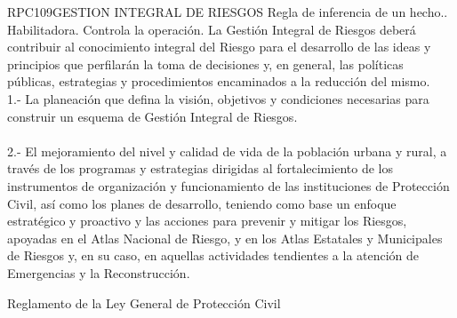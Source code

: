 \begin{BusinessRule}{RPC109}{GESTION INTEGRAL DE RIESGOS}{
		Regla de inferencia de un hecho..
	}{
		Habilitadora. 
	}{
		Controla la operación. %
	}
	\BRItem[Descripción:] La Gestión Integral de Riesgos deberá contribuir al conocimiento integral del Riesgo para el desarrollo de las ideas y principios que perfilarán la toma de decisiones y, en general, las políticas públicas, estrategias y procedimientos encaminados a la reducción del mismo.\\1.- La planeación que defina la visión, objetivos y condiciones necesarias para construir un esquema de Gestión Integral de Riesgos.\\ \\2.- El mejoramiento del nivel y calidad de vida de la población urbana y rural, a través de los programas y estrategias dirigidas al fortalecimiento de los instrumentos de organización y funcionamiento de las instituciones de Protección Civil, así como los planes de desarrollo, teniendo como base un enfoque estratégico y proactivo y las acciones para prevenir y mitigar los Riesgos, apoyadas en el Atlas Nacional de Riesgo, y en los Atlas Estatales y Municipales de Riesgos y, en su caso, en aquellas actividades tendientes a la atención de Emergencias y la Reconstrucción.
	
	
	 Reglamento de la Ley General de Protección Civil
\end{BusinessRule}